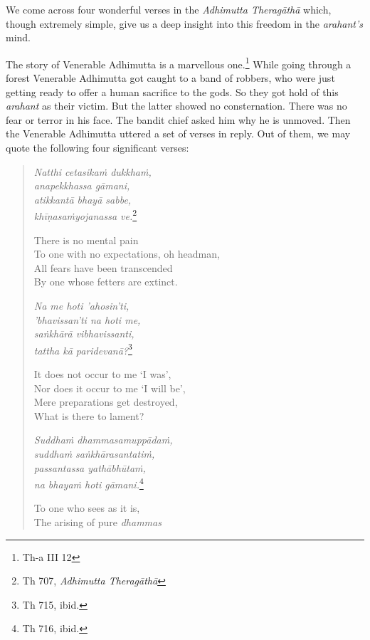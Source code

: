 We come across four wonderful verses in the \emph{Adhimutta Theragāthā} which, though extremely simple, give us a deep insight into this freedom in the \emph{arahant's} mind.

The story of Venerable Adhimutta is a marvellous one.\footnote{Th-a III 12} While going through a forest Venerable Adhimutta got caught to a band of robbers, who were just getting ready to offer a human sacrifice to the gods. So they got hold of this \emph{arahant} as their victim. But the latter showed no consternation. There was no fear or terror in his face. The bandit chief asked him why he is unmoved. Then the Venerable Adhimutta uttered a set of verses in reply. Out of them, we may quote the following four significant verses:

\begin{quote}
\emph{Natthi cetasikaṁ dukkhaṁ,}\\
\emph{anapekkhassa gāmani,}\\
\emph{atikkantā bhayā sabbe,}\\
\emph{khīṇasaṁyojanassa ve.}\footnote{Th 707, \emph{Adhimutta Theragāthā}}

There is no mental pain\\
To one with no expectations, oh headman,\\
All fears have been transcended\\
By one whose fetters are extinct.

\emph{Na me hoti 'ahosin'ti,}\\
\emph{'bhavissan'ti na hoti me,}\\
\emph{saṅkhārā vibhavissanti,}\\
\emph{tattha kā paridevanā?}\footnote{Th 715, ibid.}

It does not occur to me `I was',\\
Nor does it occur to me `I will be',\\
Mere preparations get destroyed,\\
What is there to lament?

\emph{Suddhaṁ dhammasamuppādaṁ,}\\
\emph{suddhaṁ saṅkhārasantatiṁ,}\\
\emph{passantassa yathābhūtaṁ,}\\
\emph{na bhayaṁ hoti gāmani.}\footnote{Th 716, ibid.}

To one who sees as it is,\\
The arising of pure \emph{dhammas}

\clearpage


\end{quote}
